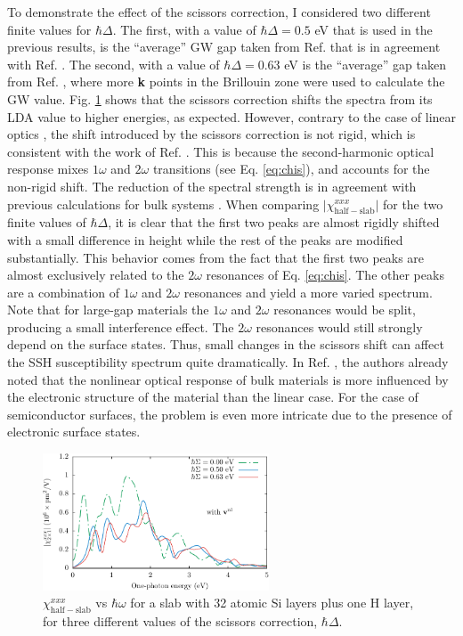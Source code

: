 To demonstrate the effect of the scissors correction, I considered two different
finite values for $\hbar\Delta$. The first, with a value of $\hbar\Delta=0.5$ eV
that is used in the previous results, is the ``average'' GW gap taken from Ref.
\cite{rohlfingPRB95} that is in agreement with Ref. \cite{garciaCPC01}. The
second, with a value of $\hbar\Delta=0.63$ eV is the ``average'' gap taken from
Ref. \cite{asahiPRB00}, where more \textbf{k} points in the Brillouin zone were
used to calculate the GW value. Fig. \ref{fig:scissors} shows that the scissors
correction shifts the spectra from its LDA value to higher energies, as
expected. However, contrary to the case of linear optics \cite{cabellosPRB09},
the shift introduced by the scissors correction is not rigid, which is
consistent with the work of Ref. \cite{nastosPRB05}. This is because the
second-harmonic optical response mixes $1\omega$ and $2\omega$ transitions (see
Eq. \eqref{eq:chis}), and accounts for the non-rigid shift. The reduction of the
spectral strength is in agreement with previous calculations for bulk systems
\cite{nastosPRB05, luppiPRB10, leitsmannPRB05}. When comparing
$\vert\chi^{xxx}_{\mathrm{half-slab}}\vert$ for the two finite values of
$\hbar\Delta$, it is clear that the first two peaks are almost rigidly shifted
with a small difference in height while the rest of the peaks are modified
substantially. This behavior comes from the fact that the first two peaks are
almost exclusively related to the $2\omega$ resonances of Eq.
\eqref{eq:chis}. The other peaks are a combination of $1\omega$ and $2\omega$
resonances and yield a more varied spectrum. Note that for large-gap materials
the $1\omega$ and $2\omega$ resonances would be split, producing a small
interference effect. The $2\omega$ resonances would still strongly depend on the
surface states. Thus, small changes in the scissors shift can affect the SSH
susceptibility spectrum quite dramatically. In Ref. \cite{adolphPRB00}, the
authors already noted that the nonlinear optical response of bulk materials is
more influenced by the electronic structure of the material than the linear
case. For the case of semiconductor surfaces, the problem is even more intricate
due to the presence of electronic surface states.

\begin{figure}[t]
\centering 
\includegraphics[width=0.6\textwidth]{content/figures/fig-Si2x1-scissors}
\caption[$\chi^{xxx}_{\mathrm{half-slab}}$ with three different values of the 
scissors correction.]
{$\chi^{xxx}_{\mathrm{half-slab}}$ vs $\hbar\omega$ for a slab with 32
atomic Si layers plus one H layer, for three different values of the scissors
correction, $\hbar\Delta$.
\label{fig:scissors}} 
\end{figure}

